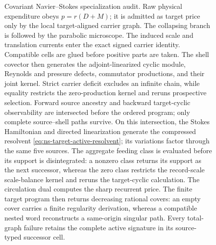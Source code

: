 \documentclass[11pt]{article}
\numberwithin{section}{part}
\theoremstyle{plain}
\theoremstyle{definition}
\theoremstyle{remark}
\begin{document}
\begin{figure}[tbp]
{%
}
\caption{Covariant Navier--Stokes specialization audit.  Raw physical
expenditure obeys \(p=r(D+M)\); it is admitted as target price only by the
local target-aligned carrier graph.  The collapsing branch is followed by the parabolic
microscope.  The induced scale and translation currents enter the exact
signed carrier identity.  Compatible cells are glued before positive parts
are taken.  The shell covector then generates the adjoint-linearized cyclic
module, Reynolds and pressure defects, commutator productions, and their
joint kernel.  Strict carrier deficit excludes an infinite chain, while
equality restricts the zero-production kernel and reruns prospective
selection.  Forward source ancestry and backward target-cyclic observability
are intersected before the ordered program; only complete source--shell paths
survive.  On this intersection, the Stokes Hamiltonian and directed
linearization generate the compressed resolvent
\eqref{eq:ns-target-active-resolvent}; its variations factor through the
same five sources.  The aggregate feeding class is evaluated before its support is
disintegrated: a nonzero class returns its support as the next successor,
whereas the zero class restricts the record-scale scale-balance kernel and
reruns the target-cyclic calculation.  The circulation dual computes the
sharp recurrent price.  The
finite target program then returns decreasing rational covers: an empty
cover carries a finite regularity derivation, whereas a compatible nested
word reconstructs a same-origin singular path.  Every total-graph failure
retains the complete active signature in its source-typed successor cell.}
\label{fig:ns-backend-audit}
\end{figure}
\end{document}
